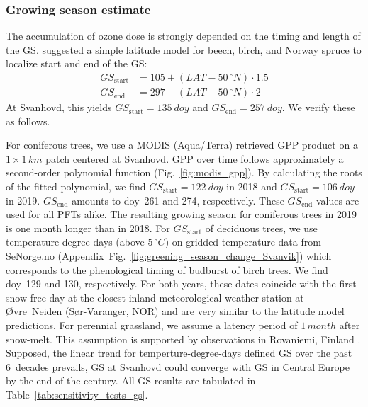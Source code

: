 \documentclass[bg, manuscript]{copernicus}
\begin{document}
\subsubsection{Growing season estimate}
\label{subsec:gs_est}

The accumulation of ozone dose is strongly depended on the timing and length of the GS. \citet{ICP:MappingManual2017} suggested a simple latitude model for beech, birch, and Norway spruce to localize start and end of the GS:
%
\begin{align}
  GS_\mathrm{start} &= 105 + (LAT-50\,\unit{^\circ N})\cdot 1.5\\
  GS_\mathrm{end} &= 297 - (LAT-50\,\unit{^\circ N})\cdot 2
\end{align}
%
At Svanhovd, this yields $GS_\mathrm{start}=135~\unit{doy}$ and $GS_\mathrm{end}=257~\unit{doy}$. We verify these as follows.

For coniferous trees, we use a MODIS (Aqua/Terra) retrieved GPP product \citep{MODIS_PSN} on a $1\times 1\,\unit{km}$ patch centered at Svanhovd. GPP over time follows approximately a second-order polynomial function (Fig.~\ref{fig:modis_gpp}). By calculating the roots of the fitted polynomial, we find $GS_\text{start}=122~\unit{doy}$ in 2018 and $GS_\text{start}=106~\unit{doy}$ in 2019. $GS_\text{end}$ amounts to \unit{doy}~261 and 274, respectively. These $GS_\mathrm{end}$ values are used for all PFTs alike. The resulting growing season for coniferous trees in 2019 is one month longer than in 2018. For $GS_\text{start}$ of deciduous trees, we use temperature-degree-days (above $5\,\unit{^\circ C}$) on gridded temperature data from SeNorge.no (Appendix~Fig.~\ref{fig:greening_season_change_Svanvik}) which corresponds to the phenological timing of budburst of birch trees. We find \unit{doy}~129 and 130, respectively. For both years, these dates coincide with the first snow-free day at the closest inland meteorological weather station at Øvre~Neiden (Sør-Varanger, NOR) and are very similar to the latitude model predictions. For perennial grassland, we assume a latency period of $1\,\unit{month}$ after snow-melt. This assumption is supported by observations in Rovaniemi, Finland \citep[][Supplement~Fig.~S1]{FCR:Korhonen2018}. Supposed, the linear trend for temperture-degree-days defined GS over the past 6~decades prevails, GS at Svanhovd could converge with GS in Central Europe by the end of the century. All GS results are tabulated in Table~\ref{tab:sensitivity_tests_gs}.
\end{document}
